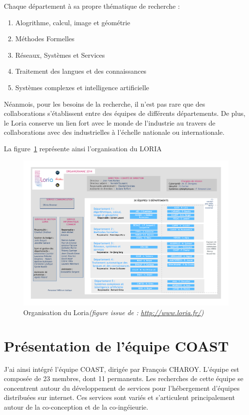\documentclass{tnreport}
\begin{document}
Chaque département à sa propre thématique de recherche :

\begin{enumerate}
  \item Alogrithme, calcul, image et géométrie
  \item Méthodes Formelles
  \item Réseaux, Systèmes et Services
  \item Traitement des langues et des connaissances
  \item Systèmes complexes et intelligence artificielle
\end{enumerate}

Néanmois, pour les besoins de la recherche, il n'est pas rare que des collaborations s'établissent entre des équipes de différents départements. De plus, le Loria conserve un lien fort avec le monde de l'industrie au travers de collaborations avec des industrielles à l'échelle nationale ou internationale.

La figure~\ref{fig:orga} représente ainsi l'organisation du LORIA 

\begin{figure}[h!]
  \centering
  \includegraphics[width=18cm]{figures/organization}
  \caption{Organisation du Loria\emph{(figure issue de : \url{http://www.loria.fr/})}}
  \label{fig:orga}
\end{figure}

\section{Présentation de l'équipe COAST} 

J'ai ainsi intégré l'équipe COAST, dirigée par François CHAROY. L'équipe est composée de 23 membres, dont 11 permanents. Les recherches de cette équipe se concentrent autour du développement de services pour l'hébergement d'équipes distribuées sur internet. Ces services sont variés et s'articulent principalement autour de la co-conception et de la co-ingéieurie.
\end{document}
